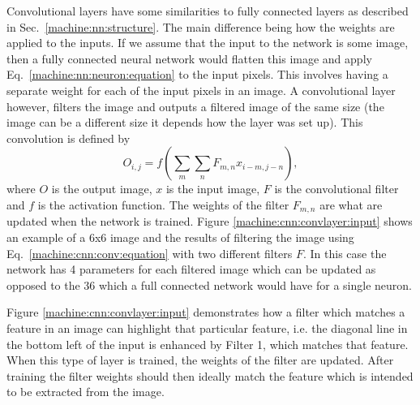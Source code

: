 Convolutional layers have some similarities to fully connected layers as described in Sec.~\ref{machine:nn:structure}. 
The main difference being how the weights are applied to the inputs.
If we assume that the input to the network is some image, then a fully connected neural network would flatten this image and apply Eq.~\ref{machine:nn:neuron:equation} to the input pixels.
This involves having a separate weight for each of the input pixels in an image.
A convolutional layer however, filters the image and outputs a filtered image of the same size (the image can be a different size it depends how the layer was set up).
This convolution is defined by
\begin{equation}
\label{machine:cnn:conv:equation}
O_{i,j} = f\left( \sum_{m} \sum_{n} F_{m,n}x_{i-m,j-n}\right) ,
\end{equation}
where $O$ is the output image, $x$ is the input image, $F$ is the convolutional filter and $f$ is the activation function.
The weights of the filter $F_{m,n}$ are what are updated when the network is trained.
Figure \ref{machine:cnn:convlayer:input} shows an example of a 6x6 image and the results of filtering the image using Eq.~\ref{machine:cnn:conv:equation} with two different filters $F$. 
In this case the network has 4 parameters for each filtered image which can be updated as opposed to the 36 which a full connected network would have for a single neuron.

Figure \ref{machine:cnn:convlayer:input} demonstrates how a filter which matches a feature in an image can highlight that particular feature,
i.e. the diagonal line in the bottom left of the input is enhanced by Filter 1, which matches that feature. 
When this type of layer is trained, the weights of the filter are updated. After training the filter weights should then ideally match the feature which is intended to be extracted from the image.

